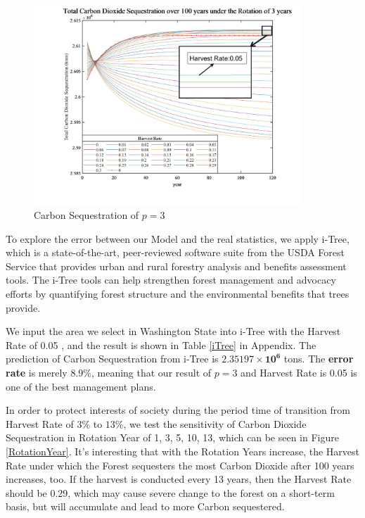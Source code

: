 \documentclass{mcmthesis}
\numberwithin{figure}{section}
\numberwithin{table}{section}
\numberwithin{equation}{section}
\begin{document}
\begin{figure}[htbp]
  \centering
  \includegraphics[width = 10cm]{code&pic/轮伐3年.pdf}
  \caption{Carbon Sequestration of $ p=3 $ }\label{Rotation3}
\end{figure}

To explore the error between our Model and the real statistics, we apply i-Tree, which
is a state-of-the-art, peer-reviewed software suite from the USDA Forest Service 
that provides urban and rural forestry analysis and benefits assessment tools. 
The i-Tree tools can help strengthen forest management and advocacy efforts by 
quantifying forest structure and the environmental benefits that trees provide.
\par
We input the area we select in Washington State into i-Tree with the Harvest Rate of 0.05
, and the result is shown in Table \ref{iTree} in Appendix. The prediction of Carbon 
Sequestration from i-Tree is $\bm{2.35197\times 10^6}$ tons. The \textbf{error rate} 
is merely $ \bm{8.9\%} $, meaning that our result of $ p = 3 $ and Harvest Rate
is 0.05 is one of the best management plans. 
\par
In order to protect interests of society during the period time of transition from 
Harvest Rate of $ 3\% $ to $ 13\% $, we test the sensitivity of Carbon Dioxide Sequestration
in Rotation Year of 1, 3, 5, 10, 13, which can be seen in Figure \ref{RotationYear}.
It's interesting that with the Rotation Years increase, the Harvest Rate under which the Forest
sequesters the most Carbon Dioxide after 100 years increases, too. If the harvest is conducted
every 13 years, then the Harvest Rate should be 0.29, which may cause severe change to the
forest on a short-term basis, but will accumulate and lead to more Carbon sequestered.
\end{document}

